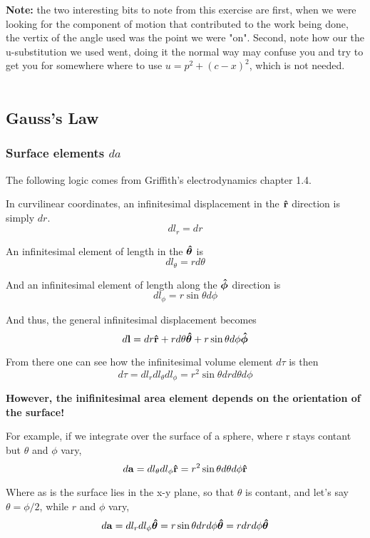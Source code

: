 \textbf{Note:} the two interesting bits to note from this exercise are first, when we were looking for the component
of motion that contributed to the work being done, the vertix of the angle used was the point we were "on".
Second, note how our the u-substitution we used went, doing it the normal way may confuse you
and try to get you for somewhere where to use $u = p^2 + (c-x)^2$, which is not needed.
\\~\\


\subsection{Gauss's Law}


\subsubsection{Surface elements $da$}

The following logic comes from Griffith's electrodynamics chapter 1.4.

In curvilinear coordinates, an infinitesimal displacement in the $\boldsymbol{\mathbf{\hat{r}}}$ direction is
simply $dr$.
$$
dl_r = dr
$$

An infinitesimal element of length in the $\boldsymbol{\mathbf{\hat{\theta}}}$ is
$$
dl_\theta = r d\theta
$$

And an infinitesimal element of length along the $\boldsymbol{\mathbf{\hat{\phi}}}$ direction
is
$$
dl_\phi = r \sin\theta d\phi
$$

And thus, the general infinitesimal displacement becomes
$$
d\boldsymbol{\mathbf{l}} =
dr \boldsymbol{\mathbf{\hat{r}}}
+ r d\theta \boldsymbol{\mathbf{\hat{\theta}}}
+ r \sin\theta d\phi \boldsymbol{\mathbf{\hat{\phi}}}
$$

From there one can see how the infinitesimal volume element $d\tau$ is then
$$
d\tau = dl_r dl_\theta dl_\phi =
r^2 \sin\theta dr d\theta d\phi
$$

\textbf{However, the inifinitesimal area element depends on the orientation of the surface!}

For example, if we integrate over the surface of a sphere, where r stays contant but $\theta$
and $\phi$ vary,
$$
d\boldsymbol{\mathbf{a}} = dl_\theta dl_\phi \boldsymbol{\mathbf{\hat{r}}} = r^2 \sin\theta d\theta d\phi \boldsymbol{\mathbf{\hat{r}}}
$$

Where as is the surface lies in the x-y plane, so that $\theta$ is contant, and let's say $\theta = \phi/2$,
while $r$ and $\phi$ vary,
$$
d\boldsymbol{\mathbf{a}} = dl_r dl_\phi \boldsymbol{\mathbf{\hat{\theta}}}
= r \sin\theta dr d\phi \boldsymbol{\mathbf{\hat{\theta}}}
= r dr d\phi \boldsymbol{\mathbf{\hat{\theta}}}
$$

